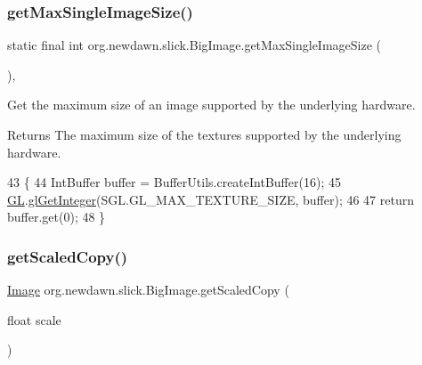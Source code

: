 \subsubsection{\texorpdfstring{get\+Max\+Single\+Image\+Size()}{getMaxSingleImageSize()}}
{\footnotesize\ttfamily static final int org.\+newdawn.\+slick.\+Big\+Image.\+get\+Max\+Single\+Image\+Size (\begin{DoxyParamCaption}{ }\end{DoxyParamCaption})\hspace{0.3cm}{\ttfamily [inline]}, {\ttfamily [static]}}

Get the maximum size of an image supported by the underlying hardware.

\begin{DoxyReturn}{Returns}
The maximum size of the textures supported by the underlying hardware. 
\end{DoxyReturn}

\begin{DoxyCode}
43                                                     \{
44         IntBuffer buffer = BufferUtils.createIntBuffer(16);
45         \mbox{\hyperlink{classorg_1_1newdawn_1_1slick_1_1_big_image_a8b0fd02f9b67f0a874e42e0a701ea7c2}{GL}}.\mbox{\hyperlink{interfaceorg_1_1newdawn_1_1slick_1_1opengl_1_1renderer_1_1_s_g_l_ab04cb68029b55582eb4b17b489cbbb2f}{glGetInteger}}(SGL.GL\_MAX\_TEXTURE\_SIZE, buffer);
46         
47         \textcolor{keywordflow}{return} buffer.get(0);
48     \}
\end{DoxyCode}
\mbox{\label{classorg_1_1newdawn_1_1slick_1_1_big_image_af08b11da9979055cdfd873e567340b1e}} 
\subsubsection{\texorpdfstring{get\+Scaled\+Copy()}{getScaledCopy()}\hspace{0.1cm}{\footnotesize\ttfamily [1/2]}}
{\footnotesize\ttfamily \mbox{\hyperlink{classorg_1_1newdawn_1_1slick_1_1_image}{Image}} org.\+newdawn.\+slick.\+Big\+Image.\+get\+Scaled\+Copy (\begin{DoxyParamCaption}\item[{float}]{scale }\end{DoxyParamCaption})\hspace{0.3cm}{\ttfamily [inline]}}

